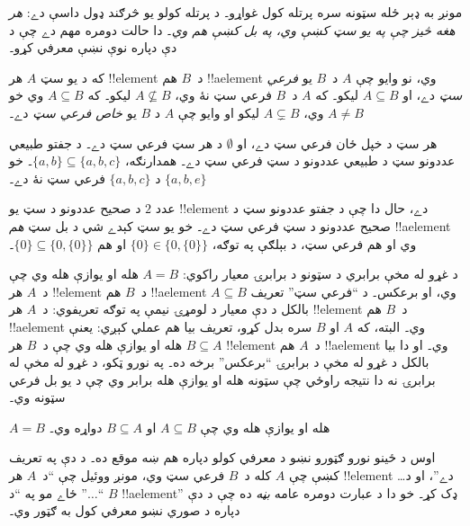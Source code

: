 \documentclass[../../../include/open-logic-section]{subfiles}
\begin{document}

\begin{explain}
مونږ به ډېر ځله سټونه سره پرتله کول غواړو۔ د پرتله کولو يو څرګند ډول داسې دے: \emph{هر هغه څيز چې په يو سټ کښې وي، په بل کښې هم وي}۔ دا حالت دومره مهم دے چې د دې دپاره نوې نښې معرفي کړو۔
\end{explain}

\begin{defn}[فرعي سټ]
که د يو سټ $A$ هر !!{element} د~$B$ هم !!a{element} وي، نو وايو چې $A$ د~$B$ يو \emph{فرعي سټ} دے، او $A \subseteq B$ ليکو۔ که $A$ د~$B$ فرعي سټ نۀ وي، $A \not\subseteq B$ ليکو۔ که $A \subseteq B$ وي خو $A \neq B$ وي، $A \subsetneq B$ ليکو او وايو چې $A$ د $B$ يو \emph{خاص فرعي سټ} دے۔
\end{defn}

\begin{ex}
هر سټ د خپل ځان فرعي سټ دے، او $\emptyset$ د هر سټ فرعي سټ دے۔ د جفتو طبيعي عددونو سټ د طبيعي عددونو د سټ فرعي سټ دے۔ همدارنګه، $\{ a, b \} \subseteq \{ a, b, c \}$۔ خو $\{ a, b, e \}$ د $\{ a, b, c \}$ فرعي سټ نۀ دے۔
\end{ex}

\begin{ex}
عدد $2$ د صحيح عددونو د سټ يو !!{element} دے، حال دا چې د جفتو عددونو سټ د صحيح عددونو د سټ فرعي سټ دے۔ خو يو سټ کېدے شي د بل سټ \emph{هم} !!a{element} وي او هم فرعي سټ، د بېلګې په توګه، $\{0\} \in \{0, \{0\}\}$ او هم $\{0\} \subseteq \{0, \{0\}\}$۔
\end{ex}

د غړو له مخې برابري د سټونو د برابرۍ معيار راکوي: $A = B$ هله او يوازې هله وي چې د~$A$ هر !!{element} د~$B$ هم !!a{element} وي، او برعکس۔ د ``فرعي سټ'' تعريف $A \subseteq B$ بالکل د دې معيار د لومړۍ نيمې په توګه تعريفوي: د~$A$ هر !!{element} د~$B$ هم !!a{element} وي۔ البته، که $A$ او $B$ سره بدل کړو، تعريف بيا هم عملي کېږي: يعنې $B \subseteq A$ هله او يوازې هله وي چې د~$B$ هر !!{element} د~$A$ هم !!a{element} وي۔ او دا بيا بالکل د غړو له مخې د برابرۍ ``برعکس'' برخه ده۔ په نورو ټکو، د غړو له مخې له برابرۍ نه دا نتيجه راوځي چې سټونه هله او يوازې هله برابر وي چې د يو بل فرعي سټونه وي۔

\begin{prop}
$A = B$ هله او يوازې هله وي چې $A \subseteq B$ او $B \subseteq A$ دواړه وي۔
\end{prop}

اوس د ځينو نورو ګټورو نښو د معرفي کولو دپاره هم ښه موقع ده۔ د دې په تعريف کښې چې $A$ کله د~$B$ فرعي سټ وي، مونږ ووئيل چې ``د~$A$ هر !!{element} \dots دے''، او د ``$\dots$'' ځاے مو په ``د $B$ !!a{element}'' ډک کړ۔ خو دا د عبارت دومره عامه \emph{بڼه} ده چې د دې دپاره د صوري نښو معرفي کول به ګټور وي۔
\end{document}
